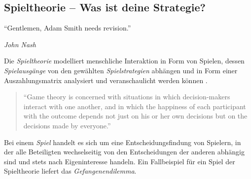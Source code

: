 \subsection{Spieltheorie -- Was ist deine Strategie?}

\epigraph{
		``Gentlemen, Adam Smith needs revision.''}
	{
		\emph{John Nash
	}

Die \emph{Spieltheorie} modelliert menschliche Interaktion in Form von Spielen, dessen \emph{Spielausgänge} von den gewählten \emph{Spielstrategien} abhängen und in Form einer Auszahlungsmatrix analysiert und veranschaulicht werden können \parencite[vgl.][153-274]{Kleinberg-2009-oz}.

	\begin{quote}
		``Game theory is concerned with situations in which decision-makers interact with one another, and in which the happiness of each participant with the outcome depends not just on his or her own decisions but on the decisions made by everyone.''
			\parencite[vgl.][156]{Kleinberg-2009-oz}
	\end{quote}

Bei einem \emph{Spiel} handelt es sich um eine Entscheidungsfindung von Spielern, in der alle Beteiligten wechselseitig von den Entscheidungen der anderen abhängig sind und stets nach Eigeninteresse handeln.
Ein Fallbeispiel für ein Spiel der Spieltheorie liefert das \emph{Gefangenendilemma}.

}
